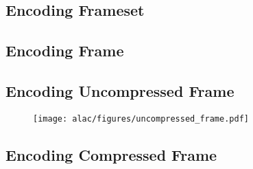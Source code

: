 \clearpage

\subsection{Encoding Frameset}
\label{alac:encode_frameset}
{
  
}


\clearpage

\subsection{Encoding Frame}
\label{alac:encode_frame}
{
  
}

\clearpage

\subsection{Encoding Uncompressed Frame}
\label{alac:write_uncompressed_frame}
{
  
}

\begin{figure}[h]
  \texttt{[image: alac/figures/uncompressed\_frame.pdf]}
\end{figure}

\clearpage

\subsection{Encoding Compressed Frame}
\label{alac:write_compressed_frame}
{
  
}

